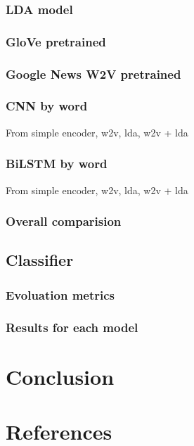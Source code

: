 \documentclass[11pt]{article}
\begin{document}
\subsubsection{LDA model}


\subsubsection{GloVe pretrained}

\subsubsection{Google News W2V pretrained}

\subsubsection{CNN by word}

From simple encoder, w2v, lda, w2v + lda

\subsubsection{BiLSTM by word}

From simple encoder, w2v, lda, w2v + lda

\subsubsection{Overall comparision}

\subsection{Classifier}
\subsubsection{Evoluation metrics}
\subsubsection{Results for each model}


\section{Conclusion}


\section{References}
\end{document}
